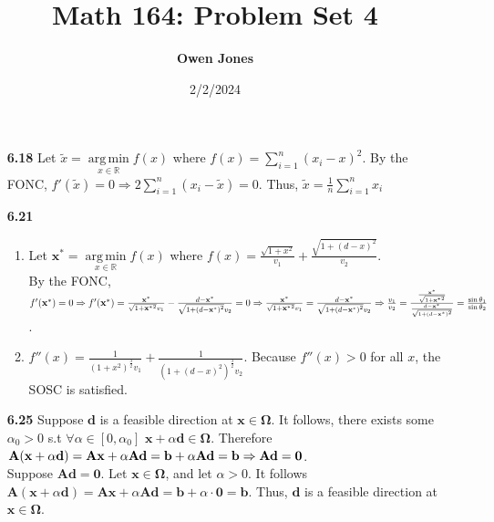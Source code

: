 \documentclass[10pt]{article}
\title{\bf Math 164: Problem Set 4}
\date{2/2/2024}
\author{\bf Owen Jones}
\DeclareMathOperator*{\argmin}{arg\,min}
\begin{document}
\maketitle
\begin{enumerate}
    \item [\textbf{6.18}] Let $\tilde{x}=\underset{x\in \mathbb{R}}{\argmin}f(x)$ where $f(x)=\displaystyle\sum_{i=1}^{n}{(x_i-x)}^2$. 
    By the FONC, $f'(\tilde{x})=0\Rightarrow \displaystyle2\sum_{i=1}^{n}{(x_i-\tilde{x})}=0$. Thus, $\tilde{x}=\frac{1}{n}\displaystyle\sum_{i=1}^{n}x_i$
    \item [\textbf{6.21}] \begin{enumerate}
        \item Let $\mathbf{x}^*=\underset{x\in \mathbb{R}}{\argmin}f(x)$ where $f(x)=\frac{\sqrt{1+x^2}}{v_1}+\frac{\sqrt{1+{(d-x)}^2}}{v_2}$.\\
        By the FONC, $f'(\mathbf{x}^*)=0\Rightarrow f'(\mathbf{x}^*)=\frac{\mathbf{x}^*}{\sqrt{1+{\mathbf{x}^*}^2}v_1}-\frac{d-\mathbf{x}^*}{\sqrt{1+{(d-\mathbf{x}^*)}^2}v_2}=0\\
        \Rightarrow \frac{\mathbf{x}^*}{\sqrt{1+{\mathbf{x}^*}^2}v_1}=\frac{d-\mathbf{x}^*}{\sqrt{1+{(d-\mathbf{x}^*)}^2}v_2}\\
        \Rightarrow \frac{v_1}{v_2}=\frac{\frac{\mathbf{x}^*}{\sqrt{1+{\mathbf{x}^*}^2}}}{\frac{d-\mathbf{x}^*}{\sqrt{1+{(d-\mathbf{x}^*)}^2}}}=\frac{\sin{\theta_1}}{\sin{\theta_2}}$.
        \item $f''(x)=\frac{1}{{(1+x^2)}^\frac{3}{2}v_1}+\frac{1}{{(1+{(d-x)}^2)}^\frac{3}{2}v_2}$. Because $f''(x)>0$ for all $x$, the SOSC is satisfied.
    \end{enumerate}
    \item [\textbf{6.25}] Suppose $\mathbf{d}$ is a feasible direction at $\mathbf{x}\in\mathbf{\Omega}$. 
    It follows, there exists some $\alpha_0>0$ s.t $\forall\alpha\in[0,\alpha_0]$ $\mathbf{x}+\alpha\mathbf{d}\in\mathbf{\Omega}$.
    Therefore $\mathbf{A}(\mathbf{x}+\alpha\mathbf{d})=\mathbf{A}\mathbf{x}+\alpha\mathbf{A}\mathbf{d}=\mathbf{b}+\alpha\mathbf{A}\mathbf{d}=\mathbf{b}\\
    \Rightarrow \mathbf{A}\mathbf{d}=\mathbf{0}$.\\
    Suppose $\mathbf{A}\mathbf{d}=\mathbf{0}$.
    Let $\mathbf{x}\in\mathbf{\Omega}$, and let $\alpha>0$.
    It follows $\mathbf{A}(\mathbf{x}+\alpha\mathbf{d})=\mathbf{A}\mathbf{x}+\alpha\mathbf{A}\mathbf{d}=\mathbf{b}+\alpha\cdot\mathbf{0}=\mathbf{b}$.
    Thus, $\mathbf{d}$ is a feasible direction at $\mathbf{x}\in\mathbf{\Omega}$.

\end{enumerate}
\end{document}
